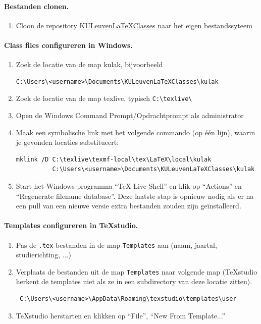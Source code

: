 \documentclass[kulak]{kulakarticle} %
\begin{document}
\paragraph{Bestanden clonen.}

\begin{enumerate}
	\item Cloon de repository \href{https://github.com/srebry/KULeuvenLaTeXClasses}{KULeuvenLaTeXClasses} naar het eigen bestandssyteem
\end{enumerate}

\paragraph{Class files configureren in Windows.}
\begin{enumerate}[resume]
	\item Zoek de locatie van de map kulak, bijvoorbeeld \begin{verbatim}
C:\Users\<username>\Documents\KULeuvenLaTeXClasses\kulak
\end{verbatim}
	\item Zoek de locatie van de map texlive, typisch \verb+C:\texlive\+
	\item Open de Windows Command Prompt/Opdrachtprompt als administrator
	\item Maak een symbolische link met het volgende commando (op één lijn), waarin je gevonden locaties substitueert:
	      \begin{verbatim}
mklink /D C:\texlive\texmf-local\tex\LaTeX\local\kulak
          C:\Users\<username>\Documents\KULeuvenLaTeXClasses\kulak
\end{verbatim}
	\item Start het Windows-programma ``TeX Live Shell'' en klik op ``Actions'' en ``Regenerate filename database''. Deze laatste stap is opnieuw nodig als er na een pull van een nieuwe versie extra bestanden zouden zijn geïnstalleerd.
\end{enumerate}

\paragraph{Templates configureren in TeXstudio.}
\begin{enumerate}
	\item Pas de \texttt{.tex}-bestanden in de map \texttt{Templates} aan (naam, jaartal, studierichting, ...)
	\item Verplaats de bestanden uit de map \texttt{Templates} naar volgende map (TeXstudio herkent de templates niet als ze in een subdirectory van deze locatie zitten).
	      \begin{verbatim} C:\Users\<username>\AppData\Roaming\texstudio\templates\user\end{verbatim}
	\item TeXstudio herstarten en klikken op ``File'', ``New From Template...''
\end{enumerate}
\end{document}
